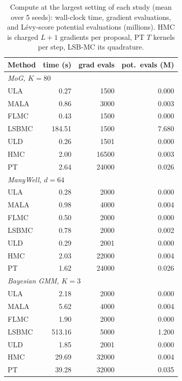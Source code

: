 \begin{table}[t]
\centering
\small
\caption{Compute at the largest setting of each study (mean over 5 seeds): wall-clock time, gradient evaluations, and L\'evy-score potential evaluations (millions). HMC is charged $L{+}1$ gradients per proposal, PT $T$ kernels per step, LSB-MC its quadrature.}
\label{tab:compute}
\begin{tabular}{lrrr}
\toprule
Method & time (s) & grad evals & pot.\ evals (M) \\
\midrule
\multicolumn{4}{l}{\textit{MoG, $K=80$}}\\
ULA & 0.27 & 1500 & 0.000 \\
MALA & 0.86 & 3000 & 0.003 \\
FLMC & 0.43 & 1500 & 0.000 \\
LSBMC & 184.51 & 1500 & 7.680 \\
ULD & 0.26 & 1501 & 0.000 \\
HMC & 2.00 & 16500 & 0.003 \\
PT & 2.64 & 24000 & 0.026 \\
\midrule
\multicolumn{4}{l}{\textit{ManyWell, $d=64$}}\\
ULA & 0.28 & 2000 & 0.000 \\
MALA & 0.98 & 4000 & 0.004 \\
FLMC & 0.50 & 2000 & 0.000 \\
LSBMC & 0.78 & 2000 & 0.002 \\
ULD & 0.29 & 2001 & 0.000 \\
HMC & 2.03 & 22000 & 0.004 \\
PT & 1.62 & 24000 & 0.026 \\
\midrule
\multicolumn{4}{l}{\textit{Bayesian GMM, $K=3$}}\\
ULA & 2.18 & 2000 & 0.000 \\
MALA & 5.62 & 4000 & 0.004 \\
FLMC & 1.90 & 2000 & 0.000 \\
LSBMC & 513.16 & 5000 & 1.200 \\
ULD & 1.85 & 2001 & 0.000 \\
HMC & 29.69 & 32000 & 0.004 \\
PT & 39.28 & 32000 & 0.035 \\
\bottomrule
\end{tabular}
\end{table}